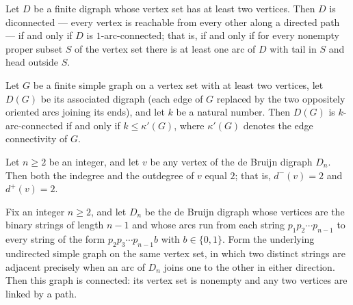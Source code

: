\begin{theorem}
\label{diconnected_iff_isKArcConnected_one}
\leanok
{}
Let $D$ be a finite digraph whose vertex set has at least two vertices. Then $D$ is
diconnected — every vertex is reachable from every other along a directed path — if and
only if $D$ is $1$-arc-connected; that is, if and only if for every nonempty proper
subset $S$ of the vertex set there is at least one arc of $D$ with tail in $S$ and head
outside $S$.
\end{theorem}

\begin{theorem}
\label{associatedDigraph_isKArcConnected_iff}
\leanok
{}
Let $G$ be a finite simple graph on a vertex set with at least two vertices, let $D(G)$
be its associated digraph (each edge of $G$ replaced by the two oppositely oriented arcs
joining its ends), and let $k$ be a natural number. Then $D(G)$ is $k$-arc-connected if
and only if $k \le \kappa'(G)$, where $\kappa'(G)$ denotes the edge connectivity of $G$.
\end{theorem}

\begin{theorem}
\label{deBruijnDigraph_indegree_eq_two}
\leanok
{}
Let $n \ge 2$ be an integer, and let $v$ be any vertex of the de Bruijn digraph $D_n$.
Then both the indegree and the outdegree of $v$ equal $2$; that is, $d^{-}(v) = 2$ and
$d^{+}(v) = 2$.
\end{theorem}

\begin{theorem}
\label{deBruijnDigraph_connected}
\leanok
{}
Fix an integer $n \ge 2$, and let $D_n$ be the de Bruijn digraph whose vertices are the
binary strings of length $n-1$ and whose arcs run from each string $p_1 p_2 \cdots
p_{n-1}$ to every string of the form $p_2 p_3 \cdots p_{n-1} b$ with $b \in \{0,1\}$.
Form the underlying undirected simple graph on the same vertex set, in which two
distinct strings are adjacent precisely when an arc of $D_n$ joins one to the other in
either direction. Then this graph is connected: its vertex set is nonempty and any two
vertices are linked by a path.
\end{theorem}

